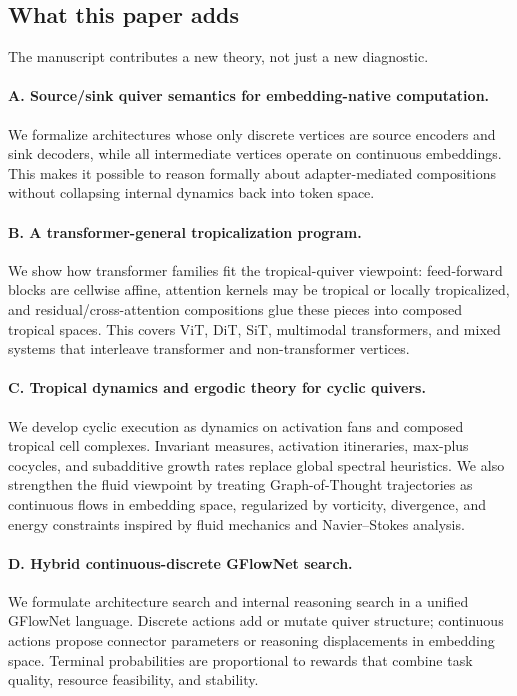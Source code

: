 \documentclass[11pt]{article}
\theoremstyle{definition}
\theoremstyle{plain}
\theoremstyle{remark}
\begin{document}
\subsection{What this paper adds}
\label{sec:contribs}

The manuscript contributes a new theory, not just a new diagnostic.

\paragraph{A. Source/sink quiver semantics for embedding-native computation.}
We formalize architectures whose only discrete vertices are source encoders and sink decoders, while all intermediate vertices operate on continuous embeddings.
This makes it possible to reason formally about adapter-mediated compositions without collapsing internal dynamics back into token space.

\paragraph{B. A transformer-general tropicalization program.}
We show how transformer families fit the tropical-quiver viewpoint:
feed-forward blocks are cellwise affine, attention kernels may be tropical or locally tropicalized, and residual/cross-attention compositions glue these pieces into composed tropical spaces.
This covers ViT, DiT, SiT, multimodal transformers, and mixed systems that interleave transformer and non-transformer vertices.

\paragraph{C. Tropical dynamics and ergodic theory for cyclic quivers.}
We develop cyclic execution as dynamics on activation fans and composed tropical cell complexes.
Invariant measures, activation itineraries, max-plus cocycles, and subadditive growth rates replace global spectral heuristics.
We also strengthen the fluid viewpoint by treating Graph-of-Thought trajectories as continuous flows in embedding space, regularized by vorticity, divergence, and energy constraints inspired by fluid mechanics and Navier--Stokes analysis.

\paragraph{D. Hybrid continuous-discrete GFlowNet search.}
We formulate architecture search and internal reasoning search in a unified GFlowNet language.
Discrete actions add or mutate quiver structure; continuous actions propose connector parameters or reasoning displacements in embedding space.
Terminal probabilities are proportional to rewards that combine task quality, resource feasibility, and stability.
\end{document}
